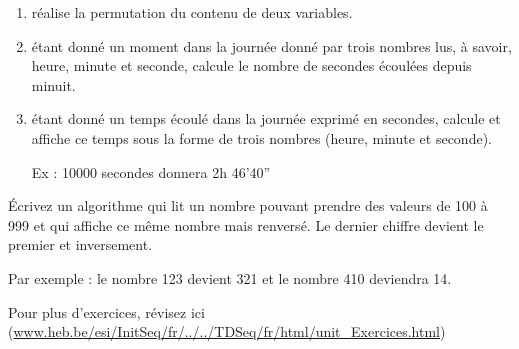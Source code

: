 \documentclass[11pt,a4paper]{article}
\begin{document}
					\begin{enumerate}
				
			\item r\'ealise la permutation du contenu de deux variables.
			\item \'etant donn\'e un moment dans la journ\'ee donn\'e par trois nombres lus, \`a savoir, heure, minute et seconde, calcule le nombre de secondes \'ecoul\'ees depuis minuit.
			\item \'etant donn\'e un temps \'ecoul\'e dans la journ\'ee exprim\'e en secondes, calcule et affiche ce temps sous la forme de trois nombres (heure, minute et seconde). \par
				
            Ex : 10000 secondes donnera 2h 46'40”
					\end{enumerate}
				
            \par
        
          \'Ecrivez un algorithme qui lit un nombre pouvant prendre des valeurs de 100 \`a 999 et qui affiche ce m\^eme nombre mais renvers\'e. 
          Le dernier chiffre devient le premier et inversement. \par
				
          Par exemple : le nombre 123 devient 321 et le nombre 410 deviendra 14.
        
            \par
        Pour plus d'exercices, 
        r\'evisez ici (\url{www.heb.be/esi/InitSeq/fr/../../TDSeq/fr/html/unit\_Exercices.html})
            \par
        
				
\end{document}

